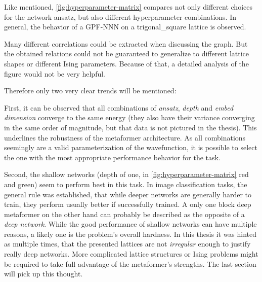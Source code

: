 Like mentioned, \autoref{fig:hyperparameter-matrix} compares not only different choices for the network ansatz, but also different hyperparameter combinations.
In general, the behavior of a GPF-NNN on a trigonal\_square lattice is observed.

Many different correlations could be extracted when discussing the graph.
But the obtained relations could not be guaranteed to generalize to different lattice shapes or different Ising parameters.
Because of that, a detailed analysis of the figure would not be very helpful.

Therefore only two very clear trends will be mentioned:

First, it can be observed that all combinations of \emph{ansatz}, \emph{depth} and \emph{embed dimension} converge to the same energy (they also have their variance converging in the same order of magnitude, but that data is not pictured in the thesis).
This underlines the robustness of the metaformer architecture.
As all combinations seemingly are a valid parameterization of the wavefunction, it is possible to select the one with the most appropriate performance behavior for the task.

Second, the shallow networks (depth of one, in \autoref{fig:hyperparameter-matrix} red and green) seem to perform best in this task.
In image classification tasks, the general rule was established, that while deeper networks are generally harder to train, they perform usually better if successfully trained.
A only one block deep metaformer on the other hand can probably be described as the opposite of a \emph{deep network}.
While the good performance of shallow networks can have multiple reasons, a likely one is the problem's overall hardness.
In this thesis it was hinted as multiple times, that the presented lattices are not \emph{irregular} enough to justify really deep networks.
More \glqq complicated\grqq{} lattice structures or Ising problems might be required to take full advantage of the metaformer's strengths. 
The last section will pick up this thought.
